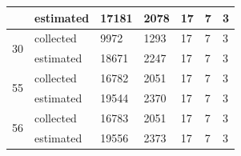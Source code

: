 \documentclass{article}
\begin{document}
\begin{table}[]
\begin{tabular}{|l|l|l|l|l|l|l|}
                                         & estimated & 17181  & 2078  & 17  & 7  & 3  \\ \hline
\multirow{2}{*}{30}                      & collected & 9972   & 1293  & 17  & 7  & 3  \\  
                                         & estimated & 18671  & 2247  & 17  & 7  & 3  \\ \hline
\multirow{2}{*}{55}                      & collected & 16782  & 2051  & 17  & 7  & 3  \\  
                                         & estimated & 19544  & 2370  & 17  & 7  & 3  \\ \hline
\multirow{2}{*}{56}                      & collected & 16783  & 2051  & 17  & 7 & 3  \\  
                                         & estimated & 19556  & 2373  & 17  & 7 & 3  \\ \hline
\end{tabular}
\end{table}
\FloatBarrier
\end{document}
